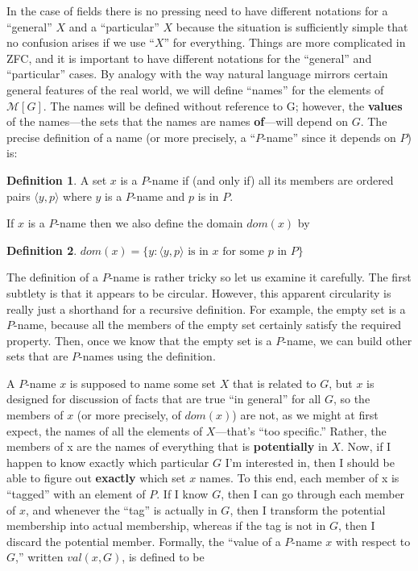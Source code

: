 \documentclass[10pt]{article}
\newcommand\axiom[1]{\textmd{#1}}
\theoremstyle{definition}
\newtheorem*{defn}{Definition}
\begin{document}
In the case of fields there is no pressing need to have different notations for a ``general'' $X$ and a ``particular'' $X$ because the situation is sufficiently simple that no confusion arises if we use ``$X$'' for everything. Things are more complicated in \axiom{ZFC}, and it is important to have different notations for the ``general'' and ``particular'' cases. By analogy with the way natural language mirrors certain general features of the real world, we will define ``names'' for the elements of $\mathcal M[G]$. The names will be defined without reference to G; however, the \textbf{values} of the names---the sets that the names are names \textbf{of}---will depend on $G$. The precise definition of a name (or more precisely, a ``$P$-name'' since it depends on $P$) is:

\begin{defn}
A set $x$ is a $P$-name if (and only if) all its members are ordered pairs $\langle y,p\rangle$ where $y$ is a $P$-name and $p$ is in $P$.
\end{defn}

If $x$ is a $P$-name then we also define the domain $dom(x)$ by

\begin{defn}
$dom(x) = \{y : \langle y,p\rangle\text{ is in }x\text{ for some }p\text{ in }P\}$
\end{defn}

The definition of a $P$-name is rather tricky so let us examine it carefully. The first subtlety is that it appears to be circular. However, this apparent circularity is really just a shorthand for a recursive definition. For example, the empty set is a $P$-name, because all the members of the empty set certainly satisfy the required property. Then, once we know that the empty set is a $P$-name, we can build other sets that are $P$-names using the definition.

A $P$-name $x$ is supposed to name some set $X$ that is related to $G$, but $x$ is designed for discussion of facts that are true ``in general'' for all $G$, so the members of $x$ (or more precisely, of $dom(x)$) are not, as we might at first expect, the names of all the elements of $X$---that's ``too specific.'' Rather, the members of x are the names of everything that is \textbf{potentially} in $X$. Now, if I happen to know exactly which particular $G$ I'm interested in, then I should be able to figure out \textbf{exactly} which set $x$ names. To this end, each member of x is ``tagged'' with an element of $P$. If I know $G$, then I can go through each member of $x$, and whenever the ``tag'' is actually in $G$, then I transform the potential membership into actual membership, whereas if the tag is not in $G$, then I discard the potential member. Formally, the ``value of a $P$-name $x$ with respect to $G$,'' written $val(x,G)$, is defined to be
\end{document}
